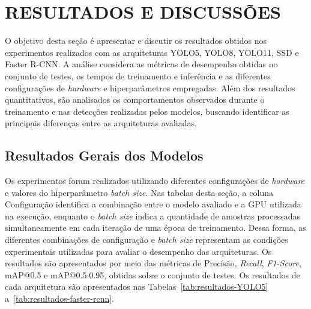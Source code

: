 \chapter{RESULTADOS E DISCUSSÕES}
\label{cap:resultados}

O objetivo desta seção é apresentar e discutir os resultados obtidos nos experimentos
realizados com as arquiteturas YOLO5, YOLO8, YOLO11, SSD e Faster R-CNN. A análise
considera as métricas de desempenho obtidas no conjunto de testes, os tempos de treinamento
e inferência e as diferentes configurações de \textit{hardware} e hiperparâmetros empregadas.
Além dos resultados quantitativos, são analisados os comportamentos observados durante o
treinamento e nas detecções realizadas pelos modelos, buscando identificar as principais
diferenças entre as arquiteturas avaliadas.

\section{Resultados Gerais dos Modelos}
\label{sec:resultados-gerais}

Os experimentos foram realizados utilizando diferentes configurações de \textit{hardware} e
valores do hiperparâmetro \textit{batch size}. Nas tabelas desta seção, a coluna
Configuração identifica a combinação entre o modelo avaliado e a GPU utilizada na
execução, enquanto o \textit{batch size} indica a quantidade de amostras processadas
simultaneamente em cada iteração de uma época de treinamento. Dessa forma, as diferentes
combinações de configuração e \textit{batch size} representam as condições experimentais
utilizadas para avaliar o desempenho das arquiteturas. Os resultados são apresentados por
meio das métricas de Precisão, \textit{Recall}, \textit{F1-Score}, mAP@0.5 e
mAP@0.5:0.95, obtidas sobre o conjunto de testes. Os resultados de cada arquitetura são
apresentados nas Tabelas~\ref{tab:resultados-YOLO5} a~\ref{tab:resultados-faster-rcnn}.

